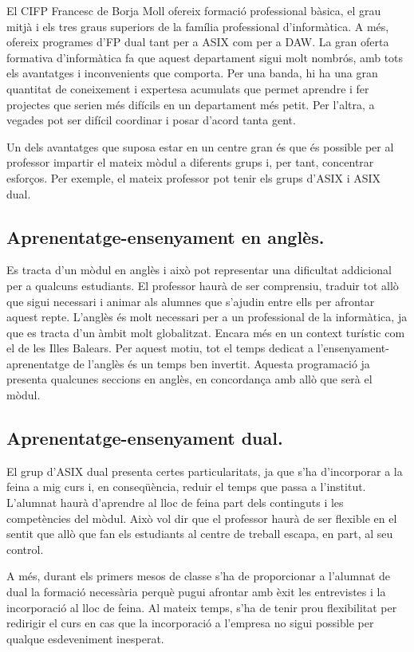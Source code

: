 \documentclass[catalan, a4paper, 12pt, titlepage]{article}
\begin{document}
El CIFP Francesc de Borja Moll ofereix formació professional bàsica, el grau mitjà i els tres graus superiors de la família professional d'informàtica. 
A més, ofereix programes d'FP dual tant per a ASIX com per a DAW.
La gran oferta formativa d'informàtica fa que aquest departament sigui molt nombrós, amb tots els avantatges i inconvenients que comporta.
Per una banda, hi ha una gran quantitat de coneixement i expertesa acumulats que permet aprendre i fer projectes que serien més difícils en un departament més petit.
Per l'altra, a vegades pot ser difícil coordinar i posar d'acord tanta gent.

Un dels avantatges que suposa estar en un centre gran és que és possible per al professor impartir el mateix mòdul a diferents grups i, per tant, concentrar esforços.
Per exemple, el mateix professor pot tenir els grups d'ASIX i ASIX dual.

\subsection{Aprenentatge-ensenyament en anglès.}

Es tracta d'un mòdul en anglès i això pot representar una dificultat addicional per a qualcuns estudiants.
El professor haurà de ser comprensiu, traduir tot allò que sigui necessari i animar als alumnes que s'ajudin entre ells per afrontar aquest repte.
L'anglès és molt necessari per a un professional de la informàtica, ja que es tracta d'un àmbit molt globalitzat.
Encara més en un context turístic com el de les Illes Balears.
Per aquest motiu, tot el temps dedicat a l'ensenyament-aprenentatge de l'anglès és un temps ben invertit.
Aquesta programació ja presenta qualcunes seccions en anglès, en concordança amb allò que serà el mòdul.

\subsection{Aprenentatge-ensenyament dual.}

El grup d'ASIX dual presenta certes particularitats, ja que s'ha d'incorporar a la feina a mig curs i, en conseqüència, reduir el temps que passa a l'institut.
L'alumnat haurà d'aprendre al lloc de feina part dels continguts i les competències del mòdul.
Això vol dir que el professor haurà de ser flexible en el sentit que allò que fan els estudiants al centre de treball escapa, en part, al seu control.

A més, durant els primers mesos de classe s'ha de proporcionar a l'alumnat de dual la formació necessària perquè pugui afrontar amb èxit les entrevistes i la incorporació al lloc de feina.
Al mateix temps, s'ha de tenir prou flexibilitat per redirigir el curs en cas que la incorporació a l'empresa no sigui possible per qualque esdeveniment inesperat.
\end{document}

